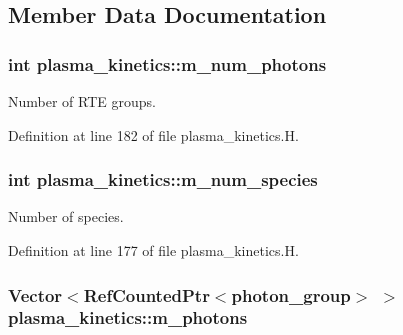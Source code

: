 \subsection{Member Data Documentation}
\subsubsection[{\texorpdfstring{m\+\_\+num\+\_\+photons}{m_num_photons}}]{\setlength{\rightskip}{0pt plus 5cm}int plasma\+\_\+kinetics\+::m\+\_\+num\+\_\+photons\hspace{0.3cm}{\ttfamily [protected]}}\hypertarget{classplasma__kinetics_aa26fec6f150ceec849a011038060641e}{}\label{classplasma__kinetics_aa26fec6f150ceec849a011038060641e}


Number of R\+TE groups. 



Definition at line 182 of file plasma\+\_\+kinetics.\+H.

\subsubsection[{\texorpdfstring{m\+\_\+num\+\_\+species}{m_num_species}}]{\setlength{\rightskip}{0pt plus 5cm}int plasma\+\_\+kinetics\+::m\+\_\+num\+\_\+species\hspace{0.3cm}{\ttfamily [protected]}}\hypertarget{classplasma__kinetics_a105cd67bd64d10cd18ce6502760a4d7f}{}\label{classplasma__kinetics_a105cd67bd64d10cd18ce6502760a4d7f}


Number of species. 



Definition at line 177 of file plasma\+\_\+kinetics.\+H.

\subsubsection[{\texorpdfstring{m\+\_\+photons}{m_photons}}]{\setlength{\rightskip}{0pt plus 5cm}Vector$<$Ref\+Counted\+Ptr$<${\bf photon\+\_\+group}$>$ $>$ plasma\+\_\+kinetics\+::m\+\_\+photons\hspace{0.3cm}{\ttfamily [protected]}}\hypertarget{classplasma__kinetics_a9057951a593f4f1450704293fd7fb000}{}\label{classplasma__kinetics_a9057951a593f4f1450704293fd7fb000}


